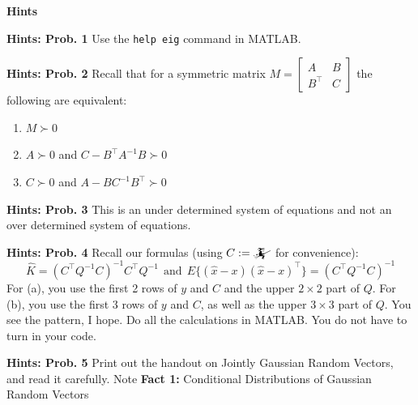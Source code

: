 \documentclass[letterpaper]{article}
\begin{document}
\begin{enumerate}
\end{enumerate}

\newpage

\begin{center}
{\bf Hints}
\end{center}

\noindent \textbf{Hints: Prob. 1 }  Use the \texttt{help eig} command in MATLAB.

\vspace{1cm}

\noindent \textbf{Hints: Prob. 2}  Recall that for a symmetric matrix $M=\left[  \begin{array}{cc} A & B \\
B^\top & C \end{array} \right]$
the following are equivalent:
 \begin{enumerate}
\setlength{\itemsep}{.1in}
\renewcommand{\labelenumi}{(\alph{enumi})}

\item $M \succ 0$

\item $A \succ 0$ and $C-B^\top A^{-1} B \succ 0$

\item $C \succ 0$ and $A-B C^{-1} B^\top \succ 0$

\end{enumerate}

\vspace{1cm}

\noindent \textbf{Hints: Prob. 3 } This is an under determined system of equations and not an over determined system of equations.

\vspace{1cm}

\noindent \textbf{Hints: Prob. 4 } Recall our formulas (using $C := \mathwitch$ for convenience):
$$ \widehat{K}=(C^\top Q^{-1}C)^{-1} C^\top Q^{-1}~~\mbox{and}~~E\{ (\widehat{x}-x)(\widehat{x}-x)^\top \}=(C^\top Q^{-1}C)^{-1}  $$
For (a), you use the first 2 rows of $y$ and $C$ and the upper $2 \times 2 $ part of $Q$. For (b), you use the first 3 rows of $y$ and $C$, as well as the upper $3 \times 3 $ part of $Q$. You see the pattern, I hope. Do all the calculations in MATLAB. You do not have to turn in your code.
\vspace{1cm}


\noindent \textbf{Hints: Prob. 5 } Print out the handout on Jointly Gaussian Random Vectors, and read it carefully.  Note \textbf{Fact 1:} Conditional Distributions of Gaussian Random Vectors
\end{document}
